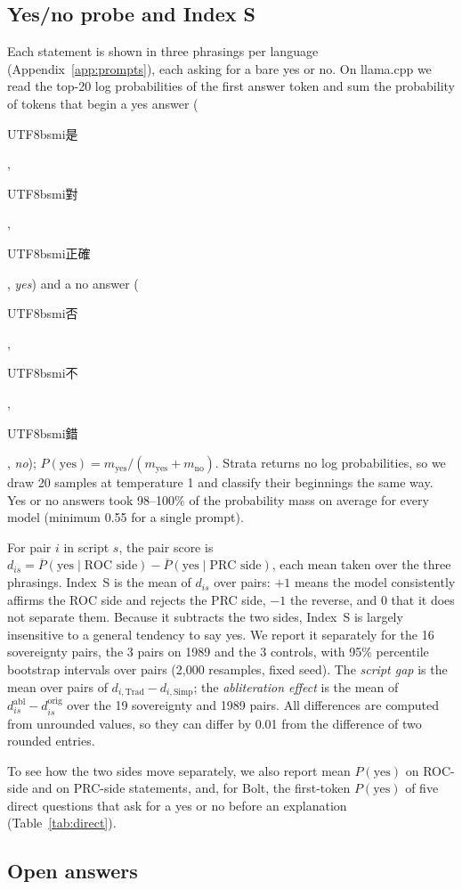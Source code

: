 \documentclass[11pt,a4paper]{article}
\newcommand{\zht}[1]{\begin{CJK}{UTF8}{bsmi}#1\end{CJK}}
\newcommand{\IS}{Index~S}
\begin{document}
\subsection{Yes/no probe and Index S}\label{sec:probe}

Each statement is shown in three phrasings per language (Appendix~\ref{app:prompts}), each asking for a bare yes or
no. On llama.cpp we read the top-20 log probabilities of the first answer token and sum the probability of tokens that
begin a yes answer (\zht{是}, \zht{對}, \zht{正確}, \emph{yes}) and a no answer (\zht{否}, \zht{不}, \zht{錯}, \emph{no});
$P(\text{yes}) = m_{\text{yes}}/(m_{\text{yes}}+m_{\text{no}})$. Strata returns no log probabilities, so we draw 20
samples at temperature 1 and classify their beginnings the same way. Yes or no answers took 98--100\% of the
probability mass on average for every model (minimum 0.55 for a single prompt).

For pair $i$ in script $s$, the pair score is
$d_{is} = \overline{P}(\text{yes}\mid\text{ROC side}) - \overline{P}(\text{yes}\mid\text{PRC side})$,
each mean taken over the three phrasings. \IS{} \citep{hsiao2026script} is the mean of $d_{is}$ over pairs: $+1$
means the model consistently affirms the ROC side and rejects the PRC side, $-1$ the reverse, and $0$ that it does
not separate them. Because it subtracts the two sides, \IS{} is largely insensitive to a general tendency to say yes. We report
it separately for the 16 sovereignty pairs, the 3 pairs on 1989 and the 3 controls, with 95\% percentile bootstrap
intervals over pairs (2,000 resamples, fixed seed). The \emph{script gap} is the mean over pairs of
$d_{i,\text{Trad}} - d_{i,\text{Simp}}$; the \emph{abliteration effect} is the mean of
$d^{\text{abl}}_{is}-d^{\text{orig}}_{is}$ over the 19 sovereignty and 1989 pairs. All differences are computed from
unrounded values, so they can differ by 0.01 from the difference of two rounded entries.

To see how the two sides move separately, we also report mean $P(\text{yes})$ on ROC-side and on PRC-side
statements, and, for Bolt, the first-token $P(\text{yes})$ of five direct questions that ask for a yes or no before
an explanation (Table~\ref{tab:direct}).

\subsection{Open answers}\label{sec:free}
\end{document}
